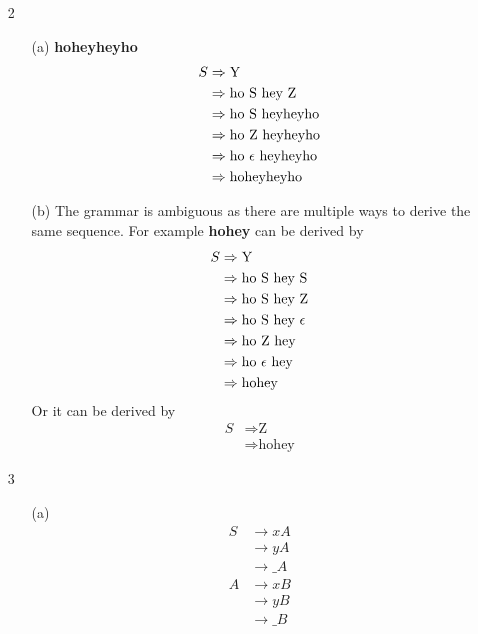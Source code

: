 \documentclass[12pt]{article}
\begin{document}
\begin{enumerate}
	\item[2]
		\begin{enumerate}
			\item[(a)]\textbf{hoheyheyho}\\
				\begin{align*}
					S &\Rightarrow \text{Y}\\
					  &\Rightarrow \text{ho S hey Z} \\
					  &\Rightarrow \text{ho S heyheyho} \\
					  &\Rightarrow \text{ho Z heyheyho} \\
					  &\Rightarrow \text{ho $ \epsilon $ heyheyho} \\
					  &\Rightarrow \text{hoheyheyho} \\
				\end{align*}
			\item[(b)] The grammar is ambiguous as there are multiple ways to derive the same sequence. For example \textbf{hohey} can be derived by
				\begin{align*}
					S &\Rightarrow \text{Y}\\
					&\Rightarrow \text{ho S hey S} \\
					&\Rightarrow \text{ho S hey Z} \\
					&\Rightarrow \text{ho S hey $ \epsilon $} \\
					&\Rightarrow \text{ho Z hey} \\
					&\Rightarrow \text{ho $ \epsilon $ hey} \\
					&\Rightarrow \text{hohey} \\
				\end{align*}
			Or it can be derived by
				\begin{align*}
					S &\Rightarrow \text{Z}\\
					  &\Rightarrow \text{hohey}
				\end{align*}
		\end{enumerate}		
	\item[3]
		\begin{enumerate}
			\item[(a)]
				\begin{align*}
					S &\rightarrow xA \\
					  &\rightarrow yA \\
					  &\rightarrow \_A \\
					A &\rightarrow xB \\
					  &\rightarrow yB \\
					  &\rightarrow \_B \\

\end{align*}
\end{enumerate}
\end{enumerate}
\end{document}
